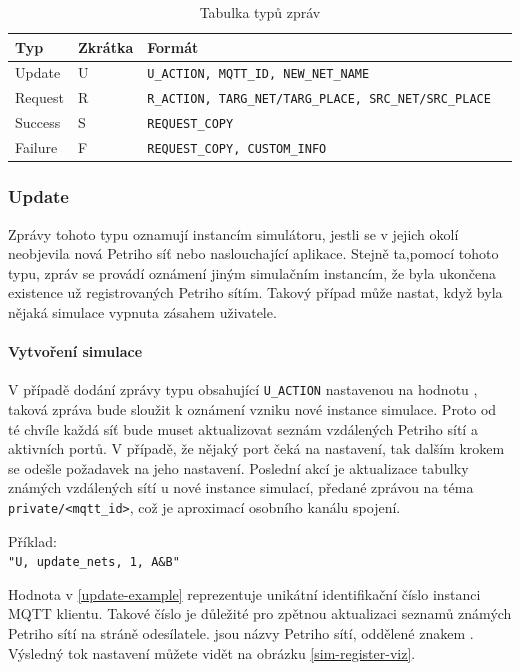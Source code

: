 \begin{table}[H]
  \vskip6pt
  \caption{Tabulka typů zpráv}
   \vskip6pt
  \centering
  \begin{tabular}{lllr}
    \toprule
    Typ & Zkrátka & Formát \\
   \midrule
   Update & U & \texttt{U\_ACTION, MQTT\_ID, NEW\_NET\_NAME} \\
   Request & R & \texttt{R\_ACTION, TARG\_NET/TARG\_PLACE, SRC\_NET/SRC\_PLACE} \\
   Success & S & \texttt{REQUEST\_COPY} \\
   Failure & F & \texttt{REQUEST\_COPY, CUSTOM\_INFO} \\
    \bottomrule
  \end{tabular}
  \label{tab:mqtt-msg-types}
\end{table}

\subsubsection{Update} Zprávy tohoto typu oznamují instancím simulátoru, jestli se v jejich okolí neobjevila nová Petriho síť nebo naslouchající aplikace. Stejně ta,pomocí tohoto typu, zpráv se provádí oznámení jiným simulačním instancím, že byla ukončena existence už registrovaných Petriho sítím. Takový případ může nastat, když byla nějaká simulace vypnuta zásahem uživatele.

\paragraph{Vytvoření simulace}

V případě dodání zprávy typu  obsahující \texttt{U\_ACTION} nastavenou na hodnotu , taková zpráva bude sloužit k oznámení vzniku nové instance simulace. Proto od té chvíle každá síť bude muset aktualizovat seznám vzdálených Petriho sítí a aktivních portů. V případě, že nějaký port čeká na nastavení, tak dalším krokem se odešle požadavek na jeho nastavení. Poslední akcí je aktualizace tabulky známých vzdálených sítí u nové instance simulací, předané zprávou na téma \texttt{private/<mqtt\_id>}, což je aproximací osobního kanálu spojení.

\begin{tabbing}
  \label{update-example}
  Příklad: \= \\
  \>\texttt{"U, update\_nets, 1, A\&B"}
\end{tabbing}

Hodnota  v \ref{update-example} reprezentuje unikátní identifikační číslo instanci MQTT klientu. Takové číslo je důležité pro zpětnou aktualizaci seznamů známých Petriho sítí na stráně odesílatele.  jsou názvy Petriho sítí, oddělené znakem \uv{\texttt{\&}}. Výsledný tok nastavení můžete vidět na obrázku \ref{sim-register-viz}.

